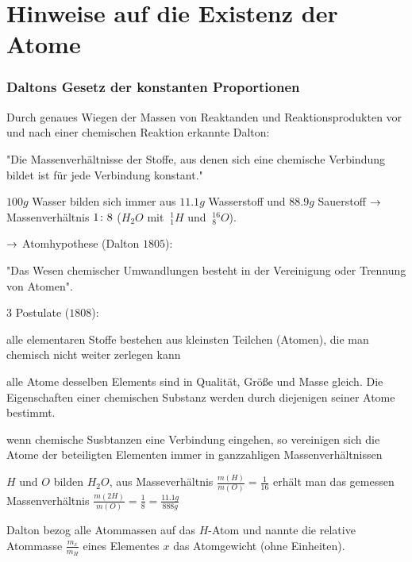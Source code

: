 \section{Hinweise auf die Existenz der Atome} %
\label{sec:Hinweise_auf_die_Existenz_der_Atome}
\subsubsection{Daltons Gesetz der konstanten Proportionen} %
\label{ssub:Daltons_Gesetz_der_konstanten_Proportionen}
Durch genaues Wiegen der Massen von Reaktanden und Reaktionsprodukten vor und
nach einer chemischen Reaktion erkannte Dalton:

"Die Massenverhältnisse der Stoffe, aus denen sich eine chemische Verbindung
bildet ist für jede Verbindung konstant."

\begin{beis}
   $100g$ Wasser bilden sich immer aus $11.1g$ Wasserstoff und $88.9g$
   Sauerstoff $\rightarrow$ Massenverhältnis $1\colon8$ ($H_2 O$ mit $\ _1^1 H$ und $\
   _8^{16} O$). 
\end{beis}

$\rightarrow$ Atomhypothese (Dalton $1805$):

"Das Wesen chemischer Umwandlungen besteht in der Vereinigung oder Trennung von
Atomen".

\begin{erlit}{$3$ Postulate ($1808$):}
    \item alle elementaren Stoffe bestehen aus kleinsten Teilchen (Atomen), die
    man chemisch nicht weiter zerlegen kann
    \item alle Atome desselben Elements sind in Qualität, Größe und Masse
    gleich. Die Eigenschaften einer chemischen Substanz werden durch diejenigen
    seiner Atome bestimmt.
    \item wenn chemische Susbtanzen eine Verbindung eingehen, so vereinigen
    sich die Atome der beteiligten Elementen immer in ganzzahligen
    Massenverhältnissen
\end{erlit}
\begin{beis}
    $H$ und $O$ bilden $H_2 O$, aus Masseverhältnis
    $\frac{m(H)}{m(O)}=\frac{1}{16}$ erhält man das gemessen Massenverhältnis
    $\frac{m(2H)}{m(O)}= \frac{1}{8} = \frac{11.1g}{888g}$
\end{beis}
Dalton bezog alle Atommassen auf das $H$-Atom und nannte die relative Atommasse
$\frac{m_x}{m_H}$ eines Elementes $x$ das Atomgewicht (ohne Einheiten).

